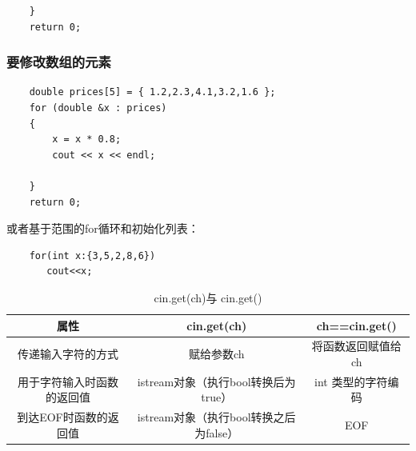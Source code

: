 \documentclass[a4paper,12pt]{article}
\begin{document}
\begin{spacing}{2}
\begin{lstlisting}
	}
	return 0;
\end{lstlisting}
\subsubsection{要修改数组的元素}
\begin{lstlisting}
    double prices[5] = { 1.2,2.3,4.1,3.2,1.6 };
	for (double &x : prices)
	{
		x = x * 0.8;
		cout << x << endl;

	}
	return 0;
\end{lstlisting}
或者基于范围的for循环和初始化列表：
\begin{lstlisting}
    for(int x:{3,5,2,8,6})
       cout<<x;
\end{lstlisting}
\begin{center}
\begin{table}[ht]
\caption{cin.get(ch)与 cin.get()} %
\centering %
\begin{tabular}{c|c|c  } %
\hline\hline %
属性 &cin.get(ch) &ch==cin.get() \\ [0.5ex] %
\hline %
 传递输入字符的方式& 赋给参数ch & 将函数返回赋值给ch  \\
 \hline
用于字符输入时函数的返回值 & istream对象（执行bool转换后为true） & int 类型的字符编码  \\
\hline
到达EOF时函数的返回值& istream对象（执行bool转换之后为false） &EOF  \\
\hline %
\end{tabular}
\label{table:nonlin} %
\end{table}

\end{center}
\end{spacing}
\end{document}
